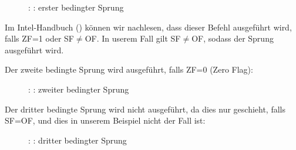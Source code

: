 \begin{figure}[H]
\centering
{}
\caption{\olly: : erster bedingter Sprung}
\label{fig:jcc_olly_signed_1}
\end{figure}
Im Intel-Handbuch () können wir nachlesen, dass dieser Befehl ausgeführt wird, falls ZF=1 oder
SF$\neq$OF. In userem Fall gilt SF$\neq$OF, sodass der Sprung ausgeführt wird.


\clearpage
Der zweite \JNZ bedingte Sprung wird ausgeführt, falls ZF=0 (Zero Flag):

\begin{figure}[H]
\centering
{}
\caption{\olly: : zweiter bedingter Sprung}
\label{fig:jcc_olly_signed_2}
\end{figure}

\clearpage
Der dritter bedingte Sprung \JBE wird nicht ausgeführt, da dies nur geschieht, falls SF=OF, und dies in unserem Beispiel
nicht der Fall ist:

\begin{figure}[H]
\centering
{}
\caption{\olly: : dritter bedingter Sprung}
\label{fig:jcc_olly_signed_3}
\end{figure}
